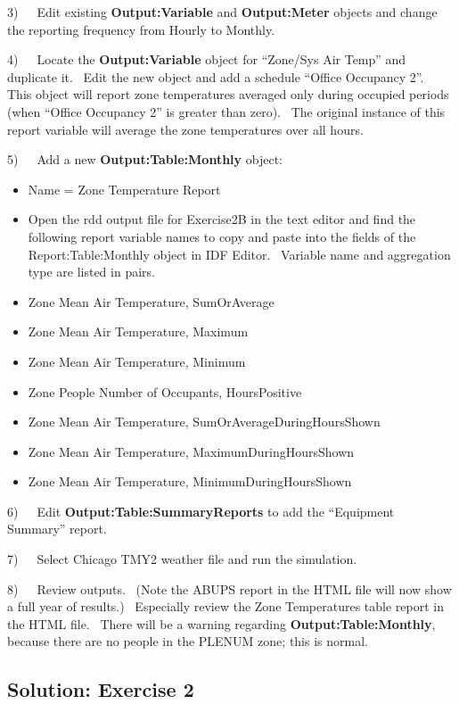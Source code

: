 3)~~~Edit existing \textbf{Output:Variable} and \textbf{Output:Meter} objects and change the reporting frequency from Hourly to Monthly.

4)~~~Locate the \textbf{Output:Variable} object for ``Zone/Sys Air Temp'' and duplicate it.~ Edit the new object and add a schedule ``Office Occupancy 2''.~ This object will report zone temperatures averaged only during occupied periods (when ``Office Occupancy 2'' is greater than zero).~ The original instance of this report variable will average the zone temperatures over all hours.

5)~~~Add a new \textbf{Output:Table:Monthly} object:

\begin{itemize}
\item
  Name = Zone Temperature Report
\item
  Open the rdd output file for Exercise2B in the text editor and find the following report variable names to copy and paste into the fields of the Report:Table:Monthly object in IDF Editor.~ Variable name and aggregation type are listed in pairs.
\item
  Zone Mean Air Temperature, SumOrAverage
\item
  Zone Mean Air Temperature, Maximum
\item
  Zone Mean Air Temperature, Minimum
\item
  Zone People Number of Occupants, HoursPositive
\item
  Zone Mean Air Temperature, SumOrAverageDuringHoursShown
\item
  Zone Mean Air Temperature, MaximumDuringHoursShown
\item
  Zone Mean Air Temperature, MinimumDuringHoursShown
\end{itemize}

6)~~~Edit \textbf{Output:Table:SummaryReports} to add the ``Equipment Summary'' report.

7)~~~Select Chicago TMY2 weather file and run the simulation.

8)~~~Review outputs.~ (Note the ABUPS report in the HTML file will now show a full year of results.)~ Especially review the Zone Temperatures table report in the HTML file.~ There will be a warning regarding \textbf{Output:Table:Monthly}, because there are no people in the PLENUM zone; this is normal.

\subsection{Solution: Exercise 2}\label{solution-exercise-2}

